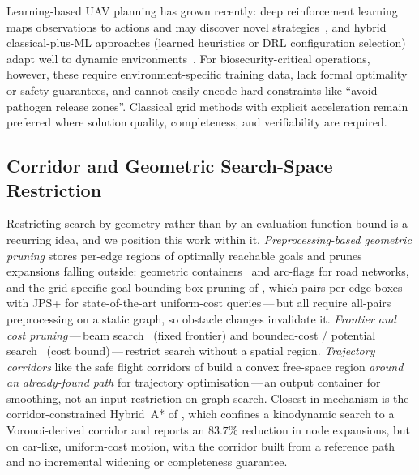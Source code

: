 \documentclass[preprint,12pt,authoryear]{elsarticle}
\begin{document}
Learning-based UAV planning has grown recently: deep reinforcement learning maps observations to actions and may discover novel strategies~\citep{Jones2023}, and hybrid classical-plus-ML approaches (learned heuristics or DRL configuration selection) adapt well to dynamic environments~\citep{Jones2023,Aggarwal2020}. For biosecurity-critical operations, however, these require environment-specific training data, lack formal optimality or safety guarantees, and cannot easily encode hard constraints like ``avoid pathogen release zones''. Classical grid methods with explicit acceleration remain preferred where solution quality, completeness, and verifiability are required.

\subsection{Corridor and Geometric Search-Space Restriction}\label{subsec:geometric_restriction}

Restricting search by geometry rather than by an evaluation-function bound is a recurring idea, and we position this work within it. \emph{Preprocessing-based geometric pruning} stores per-edge regions of optimally reachable goals and prunes expansions falling outside: geometric containers~\citep{Wagner2005} and arc-flags for road networks, and the grid-specific goal bounding-box pruning of \citet{Rabin2016}, which pairs per-edge boxes with JPS+ for state-of-the-art uniform-cost queries\,---\,but all require all-pairs preprocessing on a static graph, so obstacle changes invalidate it. \emph{Frontier and cost pruning}\,---\,beam search~\citep{Bisiani1987} (fixed frontier) and bounded-cost / potential search~\citep{Stern2014} (cost bound)\,---\,restrict search without a spatial region. \emph{Trajectory corridors} like the safe flight corridors of \citet{Liu2017} build a convex free-space region \emph{around an already-found path} for trajectory optimisation\,---\,an output container for smoothing, not an input restriction on graph search. Closest in mechanism is the corridor-constrained Hybrid~A* of \citet{Che2026}, which confines a kinodynamic search to a Voronoi-derived corridor and reports an $83.7\%$ reduction in node expansions, but on car-like, uniform-cost motion, with the corridor built from a reference path and no incremental widening or completeness guarantee.
\end{document}
